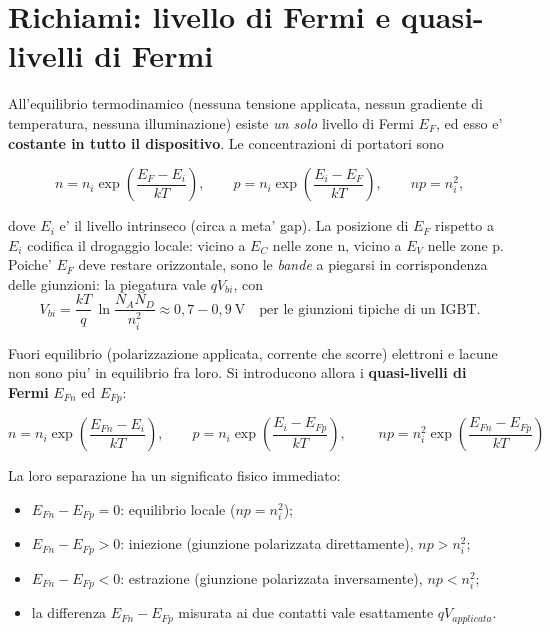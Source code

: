 \documentclass[11pt,a4paper]{article}
\begin{document}
\section{Richiami: livello di Fermi e quasi-livelli di Fermi}

All'equilibrio termodinamico (nessuna tensione applicata, nessun gradiente di
temperatura, nessuna illuminazione) esiste \emph{un solo} livello di Fermi
$E_F$, ed esso e' \textbf{costante in tutto il dispositivo}. Le concentrazioni
di portatori sono

\begin{equation}
n = n_i \exp\!\left(\frac{E_F-E_i}{kT}\right),
\qquad
p = n_i \exp\!\left(\frac{E_i-E_F}{kT}\right),
\qquad
np = n_i^2 ,
\end{equation}

dove $E_i$ e' il livello intrinseco (circa a meta' gap). La posizione di $E_F$
rispetto a $E_i$ codifica il drogaggio locale: vicino a $E_C$ nelle zone n,
vicino a $E_V$ nelle zone p. Poiche' $E_F$ deve restare orizzontale, sono le
\emph{bande} a piegarsi in corrispondenza delle giunzioni: la piegatura vale
$qV_{bi}$, con
\begin{equation}
V_{bi} = \frac{kT}{q}\,\ln\!\frac{N_A N_D}{n_i^{2}} \approx 0{,}7\!-\!0{,}9~\mathrm{V}
\quad\text{per le giunzioni tipiche di un IGBT.}
\end{equation}

Fuori equilibrio (polarizzazione applicata, corrente che scorre) elettroni e
lacune non sono piu' in equilibrio fra loro. Si introducono allora i
\textbf{quasi-livelli di Fermi} $E_{Fn}$ ed $E_{Fp}$:

\begin{equation}
n = n_i \exp\!\left(\frac{E_{Fn}-E_i}{kT}\right),\qquad
p = n_i \exp\!\left(\frac{E_i-E_{Fp}}{kT}\right),\qquad
\boxed{\;np = n_i^{2}\exp\!\left(\frac{E_{Fn}-E_{Fp}}{kT}\right)\;}
\end{equation}

La loro separazione ha un significato fisico immediato:
\begin{itemize}[nosep,leftmargin=1.4em]
  \item $E_{Fn}-E_{Fp} = 0$: equilibrio locale ($np=n_i^2$);
  \item $E_{Fn}-E_{Fp} > 0$: iniezione (giunzione polarizzata direttamente),
        $np > n_i^2$;
  \item $E_{Fn}-E_{Fp} < 0$: estrazione (giunzione polarizzata inversamente),
        $np < n_i^2$;
  \item la differenza $E_{Fn}-E_{Fp}$ misurata ai due contatti vale
        esattamente $qV_{applicata}$.
\end{itemize}
\end{document}

